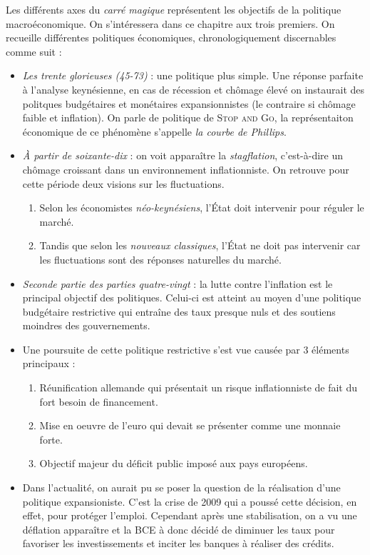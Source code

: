 Les différents axes du \emph{carré magique} représentent les objectifs de la politique macroéconomique. 
On s'intéressera dans ce chapitre aux trois premiers. 
On recueille différentes politiques économiques, chronologiquement discernables comme suit : 
\begin{itemize}[label=]
	\item \emph{Les trente glorieuses (45-73)} : une politique plus simple. 
  Une réponse parfaite à l'analyse keynésienne, en cas de récession et chômage élevé
	on instaurait des politques budgétaires et monétaires expansionnistes (le contraire si chômage faible
  et inflation). On parle de politique de \textsc{Stop and Go}, la représentaiton économique 
  de ce phénomène s'appelle \emph{la courbe de Phillips}.
	\item \emph{À partir de soixante-dix} : on voit apparaître la \emph{stagflation}, c'est-à-dire un
  chômage croissant dans un environnement inflationniste. On retrouve pour cette période deux visions
  sur les fluctuations.
  \begin{enumerate}
    \item Selon les économistes \emph{néo-keynésiens}, l'État doit intervenir pour réguler le marché.
    \item Tandis que selon les \emph{nouveaux classiques}, l'État ne doit pas intervenir car les fluctuations
    sont des réponses naturelles du marché.
  \end{enumerate}
  \item \emph{Seconde partie des parties quatre-vingt} : la lutte contre l'inflation est le principal
  objectif des politiques. Celui-ci est atteint au moyen d'une politique budgétaire restrictive
  qui entraîne des taux presque nuls et des soutiens moindres des gouvernements.
  \item Une poursuite de cette politique restrictive s'est vue causée par 3 éléments principaux : 
  \begin{enumerate}
  	\item Réunification allemande qui présentait un risque inflationniste de fait du fort besoin de financement.
  	\item Mise en oeuvre de l'euro qui devait se présenter comme une monnaie forte.
  	\item Objectif majeur du déficit public imposé aux pays européens.
  \end{enumerate}
  \item Dans l'actualité, on aurait pu se poser la question de la réalisation d'une politique expansioniste. C'est la crise de 2009 qui a poussé cette décision,
  en effet, pour protéger l'emploi. Cependant après une stabilisation, on a vu une déflation apparaître et la BCE à donc décidé de diminuer les taux pour 
  favoriser les investissements et inciter les banques à réaliser des crédits.
\end{itemize}

